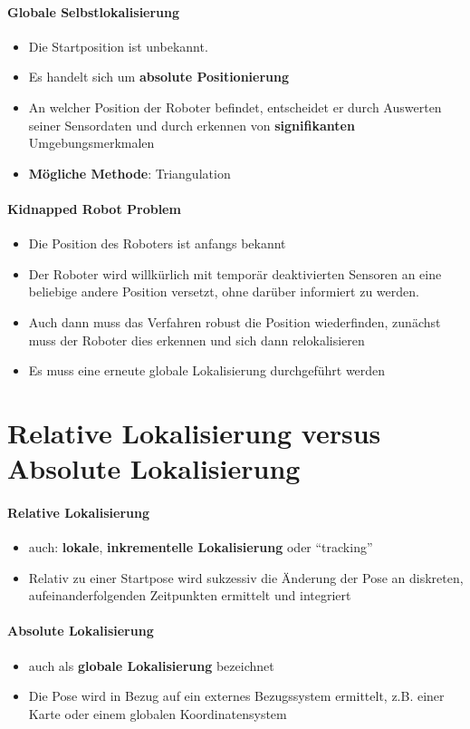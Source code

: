 \paragraph{Globale Selbstlokalisierung}
\begin{itemize}
	\item Die Startposition ist unbekannt.
	\item Es handelt sich um \textbf{absolute Positionierung}
	\item An welcher Position der Roboter befindet, entscheidet er durch Auswerten seiner Sensordaten und durch erkennen von \textbf{signifikanten} Umgebungsmerkmalen
	\item \textbf{Mögliche Methode}: Triangulation
\end{itemize}
\paragraph{Kidnapped Robot Problem}
\begin{itemize}
	\item Die Position des Roboters ist anfangs bekannt
	\item Der Roboter wird willkürlich mit temporär deaktivierten Sensoren an eine beliebige andere Position versetzt, ohne darüber informiert zu werden.
	\item Auch dann muss das Verfahren robust die Position wiederfinden, zunächst muss der Roboter dies erkennen und sich dann relokalisieren
	\item Es muss eine erneute globale Lokalisierung durchgeführt werden
\end{itemize}
\section{Relative Lokalisierung versus Absolute Lokalisierung}
\paragraph{Relative Lokalisierung}
\begin{itemize}
	\item auch: \textbf{lokale}, \textbf{inkrementelle Lokalisierung} oder \enquote{tracking}
	\item Relativ zu einer Startpose wird sukzessiv die Änderung der Pose an diskreten, aufeinanderfolgenden Zeitpunkten ermittelt und integriert
\end{itemize}
\paragraph{Absolute Lokalisierung}
\begin{itemize}
	\item auch als \textbf{globale Lokalisierung} bezeichnet
	\item Die Pose wird in Bezug auf ein externes Bezugssystem ermittelt, z.B. einer Karte oder einem globalen Koordinatensystem
\end{itemize}
